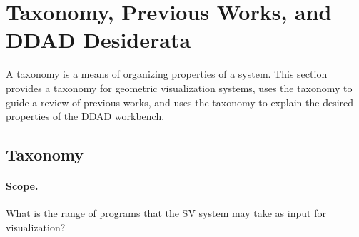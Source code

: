 \section{Taxonomy, Previous Works, and DDAD Desiderata}

A taxonomy is a means of organizing properties of a system. This section
provides a taxonomy for geometric visualization systems, uses the taxonomy to
guide a review of previous works, and uses the taxonomy to explain the desired
properties of the DDAD workbench.


\subsection{Taxonomy} 

\paragraph{Scope.} What is the range of programs that the SV system may take as
input for visualization?

